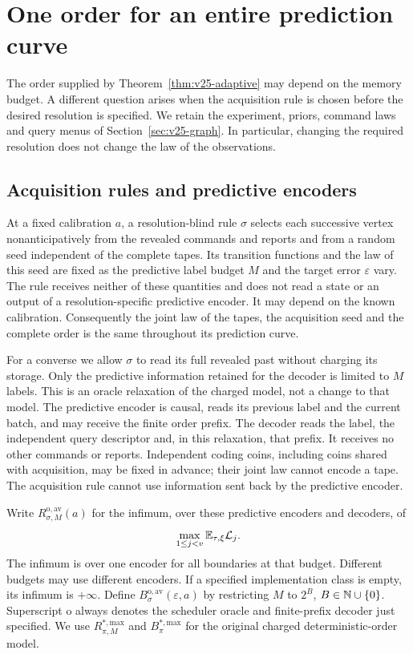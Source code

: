 \section{One order for an entire prediction curve}
\label{sec:v27-policy}
The order supplied by Theorem~\ref{thm:v25-adaptive} may depend on the memory budget. A different question arises when the acquisition rule is chosen before the desired resolution is specified. We retain the experiment, priors, command laws and query menus of Section~\ref{sec:v25-graph}. In particular, changing the required resolution does not change the law of the observations.

\subsection{Acquisition rules and predictive encoders}
\begin{definition}\label{def:v27-blind}
At a fixed calibration $a$, a resolution-blind rule $\sigma$ selects each successive vertex nonanticipatively from the revealed commands and reports and from a random seed independent of the complete tapes. Its transition functions and the law of this seed are fixed as the predictive label budget $M$ and the target error $\varepsilon$ vary. The rule receives neither of these quantities and does not read a state or an output of a resolution-specific predictive encoder. It may depend on the known calibration. Consequently the joint law of the tapes, the acquisition seed and the complete order is the same throughout its prediction curve.
\end{definition}

For a converse we allow $\sigma$ to read its full revealed past without charging its storage. Only the predictive information retained for the decoder is limited to $M$ labels. This is an oracle relaxation of the charged model, not a change to that model. The predictive encoder is causal, reads its previous label and the current batch, and may receive the finite order prefix. The decoder reads the label, the independent query descriptor and, in this relaxation, that prefix. It receives no other commands or reports. Independent coding coins, including coins shared with acquisition, may be fixed in advance; their joint law cannot encode a tape. The acquisition rule cannot use information sent back by the predictive encoder.

Write $R^{\mathrm{o,av}}_{\sigma,M}(a)$ for the infimum, over these predictive encoders and decoders, of
\[
             \max_{1\le j<v}\mathbb E_{\tau,\xi}\mathcal L_j.
\]
The infimum is over one encoder for all boundaries at that budget. Different budgets may use different encoders. If a specified implementation class is empty, its infimum is $+\infty$. Define $B^{\mathrm{o,av}}_\sigma(\varepsilon,a)$ by restricting $M$ to $2^B$, $B\in\mathbb N\cup\{0\}$. Superscript $\mathrm{o}$ always denotes the scheduler oracle and finite-prefix decoder just specified. We use $R^{*,\mathrm{max}}_{\pi,M}$ and $B^{*,\mathrm{max}}_\pi$ for the original charged deterministic-order model.

